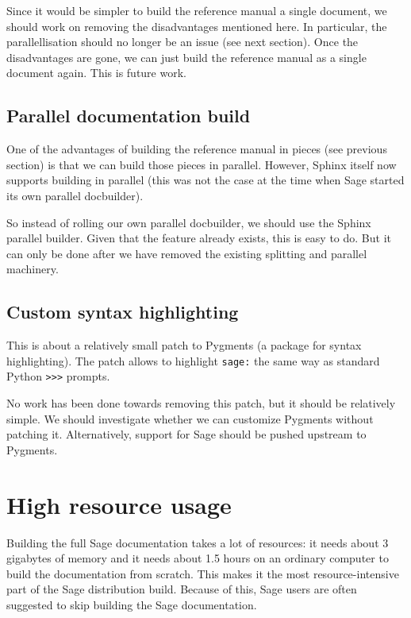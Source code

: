 \documentclass{deliverablereport}
\begin{document}
Since it would be simpler to build the reference manual a single document,
we should work on removing the disadvantages mentioned here.
In particular, the parallellisation should no longer be an issue
(see next section).
Once the disadvantages are gone, we can just build the reference manual
as a single document again.
This is future work.

\subsection{Parallel documentation build}

One of the advantages of building the reference manual in pieces
(see previous section) is that we can build those pieces in parallel.
However, Sphinx itself now supports building in parallel
(this was not the case at the time when Sage started its own parallel docbuilder).

So instead of rolling our own parallel docbuilder,
we should use the Sphinx parallel builder.
Given that the feature already exists, this is easy to do.
But it can only be done after we have removed the existing
splitting and parallel machinery.


\subsection{Custom syntax highlighting}

This is about a relatively small patch to Pygments
(a package for syntax highlighting).
The patch allows to highlight \texttt{sage:} the same way
as standard Python \texttt{>>>} prompts.

No work has been done towards removing this patch,
but it should be relatively simple.
We should investigate whether we can customize Pygments without
patching it.
Alternatively, support for Sage should be pushed upstream to Pygments.

\section{High resource usage}

Building the full Sage documentation takes a lot of resources:
it needs about 3 gigabytes of memory and it needs about 1.5 hours
on an ordinary computer to build the documentation from scratch.
This makes it the most resource-intensive part of the
Sage distribution build.
Because of this, Sage users are often suggested to skip building
the Sage documentation.
\end{document}
